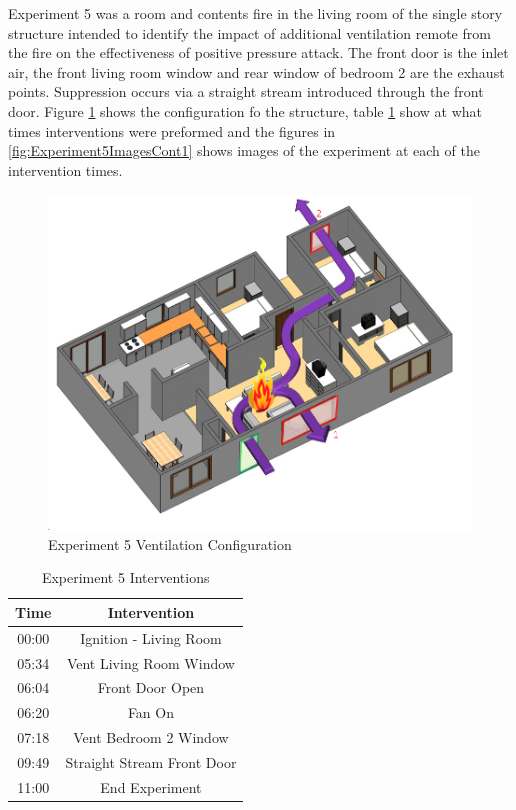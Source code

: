 \documentclass{article}
\begin{document}
Experiment 5 was a room and contents fire in the living room of the single story structure intended to identify the impact of additional ventilation remote from the fire on the effectiveness of positive pressure attack. The front door is the inlet air, the front living room window and rear window of bedroom 2 are the exhaust points. Suppression occurs via a straight stream introduced through the front door. Figure \ref{fig:Exp5VentConfig} shows the configuration fo the structure, table \ref{Table:Exp5Interventions} show at what times interventions were preformed and the figures in \ref{fig:Experiment5ImagesCont1} shows images of the experiment at each of the intervention times.

\begin{figure}[h!]
	\centering
	\includegraphics[width=5in]{0_Images/FireExperiments/Single_Story/Experiment_5.jpg}
	\caption{Experiment 5 Ventilation Configuration}
	\label{fig:Exp5VentConfig}
\end{figure}

\begin{table}[H]
	\centering
	\caption{Experiment 5 Interventions}
	\begin{tabular}{|c|c|} 
		\hline
		Time & Intervention \\ \hline \hline
		00:00 & Ignition - Living Room \\ \hline
		05:34 & Vent Living Room Window \\ \hline
		06:04 & Front Door Open \\ \hline
		06:20 & Fan On \\ \hline
		07:18 & Vent Bedroom 2 Window \\ \hline
		09:49 & Straight Stream Front Door \\ \hline
		11:00 & End Experiment \\ \hline
	\end{tabular}
	\label{Table:Exp5Interventions}
\end{table}
\end{document}
